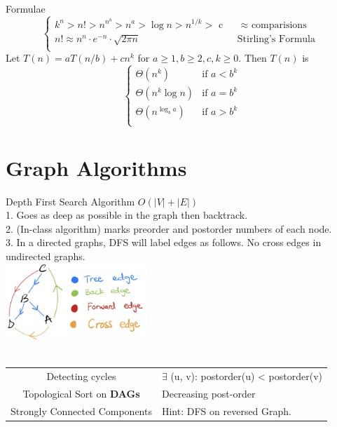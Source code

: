 \documentclass[10pt,a4paper]{article}
\begin{document}
\begin{multicols}{3}
\begin{textbox}{Formulae}
\[\begin{cases}
    k^n > n! > n^{n^b} > n^a > \log n > n^{1/k} > \text{ c } & \text{ $\approx$ comparisions} \\
    n! \approx n^n \cdot e^{-n} \cdot \sqrt{2\pi n} & \text{ Stirling's Formula }\\
\end{cases}\]
 Let $T(n) = aT(n/b) + cn^k$ for $a \geq 1, b \geq 2, c, k \geq 0$. Then $T(n)$ is 
\[\begin{cases}
    \Theta(n^k) & \text{if $a < b^k$}\\
    \Theta(n^k \log n) & \text{if $a = b^k$}\\
    \Theta(n^{\log_b a}) & \text{if $a > b^k$}\\
\end{cases}\]
\end{textbox}

\section{Graph Algorithms}
\begin{textbox}{Depth First Search Algorithm}
      $O(|V| + |E|)$ \\
    1. Goes as deep as possible in the graph then backtrack.\\
    2. (In-class algorithm) marks preorder and postorder numbers of each node.\\
    3. In a directed graphs, DFS will label edges as follows. No cross edges in undirected graphs.\\
    \includegraphics[width=0.4\textwidth]{images/dfs-edges.jpeg}\\
    \\
    \begin{tabular}{c|p{}}
         Detecting cycles & $\exists$ (u, v): postorder(u) < postorder(v)\\
         Topological Sort on {\bf DAGs} & Decreasing post-order\\
        Strongly Connected Components & Hint: DFS on reversed Graph.\\
   \end{tabular}\\
\end{textbox}


\end{multicols}
\end{document}
